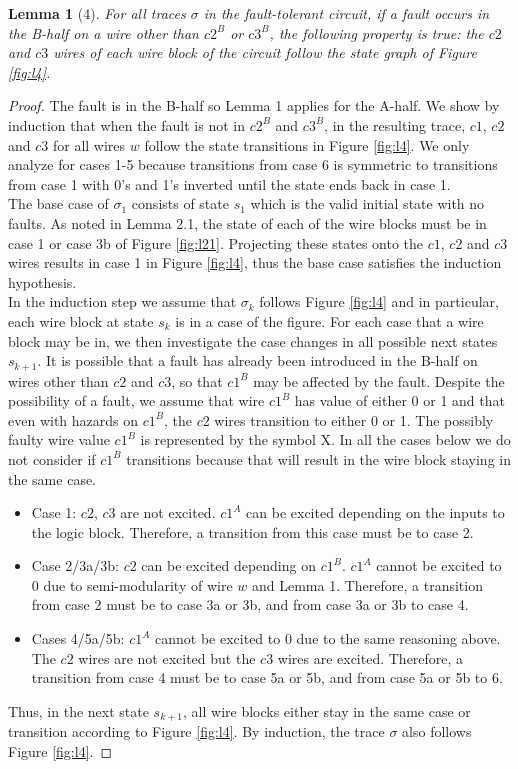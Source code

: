 \documentclass[12pt]{report}
\newtheorem*{lemma}{Lemma}
\begin{document}
\begin{lemma}[4]
For all traces $\sigma$ in the fault-tolerant circuit, if a fault occurs in the B-half on a wire other than $c2^B$ or $c3^B$, the following property is true: the $c2$ and $c3$ wires of each wire block of the circuit follow the state graph of Figure \ref{fig:l4}.
\end{lemma}
\begin{proof}
The fault is in the B-half so Lemma 1 applies for the A-half.  We show by induction that when the fault is not in $c2^B$ and $c3^B$, in the resulting trace, $c1$, $c2$ and $c3$ for all wires $w$ follow the state transitions in Figure \ref{fig:l4}.  We only analyze for cases 1-5 because transitions from case 6 is symmetric to transitions from case 1 with 0's and 1's inverted until the state ends back in case 1.\\

The base case of $\sigma_1$ consists of state $s_1$ which is the valid initial state with no faults.  As noted in Lemma 2.1, the state of each of the wire blocks must be in case 1 or case 3b of Figure \ref{fig:l21}.  Projecting these states onto the $c1$, $c2$ and $c3$ wires results in case 1 in Figure \ref{fig:l4}, thus the base case satisfies the induction hypothesis.\\

In the induction step we assume that $\sigma_k$ follows Figure \ref{fig:l4} and in particular, each wire block at state $s_k$ is in a case of the figure.  For each case that a wire block may be in, we then investigate the case changes in all possible next states $s_{k+1}$.  It is possible that a fault has already been introduced in the B-half on wires other than $c2$ and $c3$, so that $c1^B$ may be affected by the fault.  Despite the possibility of a fault, we assume that wire $c1^B$ has value of either 0 or 1 and that even with hazards on $c1^B$, the $c2$ wires transition to either 0 or 1.  The possibly faulty wire value $c1^B$ is represented by the symbol X.  In all the cases below we do not consider if $c1^B$ transitions because that will result in the wire block staying in the same case.
\begin{itemize}
	\item
Case 1:  $c2$, $c3$ are not excited.  $c1^A$ can be excited depending on the inputs to the logic block.  Therefore, a transition from this case must be to case 2.
\item
Case 2/3a/3b:  $c2$ can be excited depending on $c1^B$.  $c1^A$ cannot be excited to 0 due to semi-modularity of wire $w$ and Lemma 1.  Therefore, a transition from case 2 must be to case 3a or 3b, and from case 3a or 3b to case 4.
\item
Cases 4/5a/5b:  $c1^A$ cannot be excited to 0 due to the same reasoning above.  The $c2$ wires are not excited but the $c3$ wires are excited.  Therefore, a transition from case 4 must be to case 5a or 5b, and from case 5a or 5b to 6.
\end{itemize}
Thus, in the next state $s_{k+1}$, all wire blocks either stay in the same case or transition according to Figure \ref{fig:l4}.  
By induction, the trace $\sigma$ also follows Figure \ref{fig:l4}.  
\end{proof}
\end{document}
